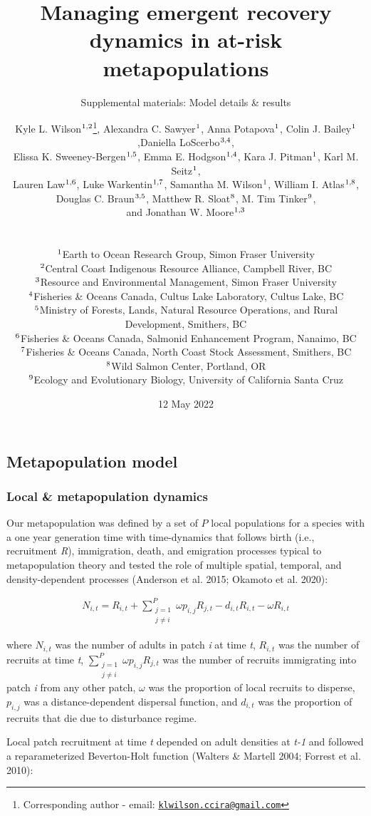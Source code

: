 \documentclass[
]{article}
\title{Managing emergent recovery dynamics in at-risk metapopulations}
\subtitle{Supplemental materials: Model details \& results}
\author{Kyle L. Wilson\(^\textup{1,2}\)\footnote{Corresponding author -
  email:
  \href{mailto:klwilson.ccira@gmail.com}{\nolinkurl{klwilson.ccira@gmail.com}}},
Alexandra C. Sawyer\(^\textup{1}\), Anna Potapova\(^\textup{1}\), Colin
J. Bailey\(^\textup{1}\),Daniella LoScerbo\(^\textup{3,4}\),\\
Elissa K. Sweeney-Bergen\(^\textup{1,5}\), Emma E.
Hodgson\(^\textup{1,4}\), Kara J. Pitman\(^\textup{1}\), Karl M.
Seitz\(^\textup{1}\),\\
Lauren Law\(^\textup{1,6}\), Luke Warkentin\(^\textup{1,7}\), Samantha
M. Wilson\(^\textup{1}\), William I. Atlas\(^\textup{1,8}\),\\
Douglas C. Braun\(^\textup{3,5}\), Matthew R. Sloat\(^\textup{8}\), M.
Tim Tinker\(^\textup{9}\),\\
and Jonathan W. Moore\(^\textup{1,3}\)\\
\strut \\
\(^\textup{1}\)Earth to Ocean Research Group, Simon Fraser University\\
\(^\textup{2}\)Central Coast Indigenous Resource Alliance, Campbell
River, BC\\
\(^\textup{3}\)Resource and Environmental Management, Simon Fraser
University\\
\(^\textup{4}\)Fisheries \& Oceans Canada, Cultus Lake Laboratory,
Cultus Lake, BC\\
\(^\textup{5}\)Ministry of Forests, Lands, Natural Resource Operations,
and Rural Development, Smithers, BC\\
\(^\textup{6}\)Fisheries \& Oceans Canada, Salmonid Enhancement Program,
Nanaimo, BC\\
\(^\textup{7}\)Fisheries \& Oceans Canada, North Coast Stock Assessment,
Smithers, BC\\
\(^\textup{8}\)Wild Salmon Center, Portland, OR\\
\(^\textup{9}\)Ecology and Evolutionary Biology, University of
California Santa Cruz}
\date{12 May 2022}
\begin{document}
\maketitle

\centering
\raggedright
\renewcommand{\baselinestretch}{1}\normalsize
\tableofcontents
\renewcommand{\baselinestretch}{0.75}\normalsize
\newpage

\pagestyle{fancy}

\hypertarget{metapopulation-model}{%
\subsection{Metapopulation model}\label{metapopulation-model}}

\hypertarget{local-metapopulation-dynamics}{%
\subsubsection{Local \& metapopulation
dynamics}\label{local-metapopulation-dynamics}}

Our metapopulation was defined by a set of \(P\) local populations for a
species with a one year generation time with time-dynamics that follows
birth (i.e., recruitment \emph{R}), immigration, death, and emigration
processes typical to metapopulation theory and tested the role of
multiple spatial, temporal, and density-dependent processes (Anderson et
al. 2015; Okamoto et al. 2020):

\begin{align}
N_{i,t}= R_{i,t}+{\sum\limits_{\substack{j=1 \\ j\neq i}}^{P} \omega p_{i,j}R_{j,t}}-d_{i,t}R_{i,t}-\omega R_{i,t}
\end{align}

where \(N_{i,t}\) was the number of adults in patch \emph{i} at time
\emph{t}, \(R_{i,t}\) was the number of recruits at time \emph{t},
\({\sum\limits_{\substack{j=1 \\ j\neq i}}^{P} \omega p_{i,j}R_{j,t}}\)
was the number of recruits immigrating into patch \emph{i} from any
other patch, \(\omega\) was the proportion of local recruits to
disperse, \(p_{i,j}\) was a distance-dependent dispersal function, and
\(d_{i,t}\) was the proportion of recruits that die due to disturbance
regime.

Local patch recruitment at time \emph{t} depended on adult densities at
\emph{t-1} and followed a reparameterized Beverton-Holt function
(Walters \& Martell 2004; Forrest et al. 2010):
\end{document}
